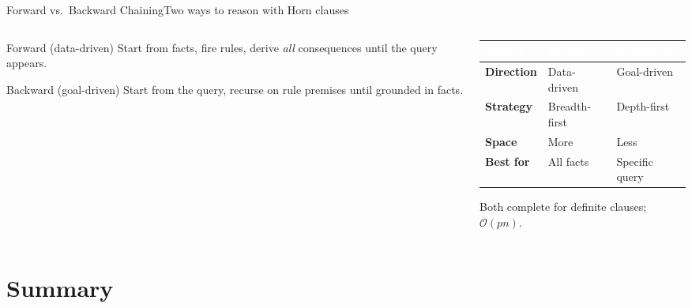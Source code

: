 \documentclass[aspectratio=169,11pt]{beamer}
\begin{document}
\begin{frame}{Forward vs.\ Backward Chaining}{Two ways to reason with Horn clauses}
  \begin{columns}[T]
    \begin{column}{0.5\textwidth}
      \begin{block}{Forward (data-driven)}
        \small Start from facts, fire rules, derive \emph{all} consequences until
        the query appears.
      \end{block}
      \begin{exampleblock}{Backward (goal-driven)}
        \small Start from the query, recurse on rule premises until grounded in facts.
      \end{exampleblock}
    \end{column}
    \begin{column}{0.5\textwidth}
      \small
      \renewcommand{\arraystretch}{1.3}
      \begin{tabularx}{\linewidth}{@{}>{\bfseries}l >{\raggedright\arraybackslash}X >{\raggedright\arraybackslash}X@{}}
        \toprule
        \rowcolor{PrimaryDark}
        \textcolor{white}{Aspect} & \textcolor{white}{Forward} & \textcolor{white}{Backward} \\
        \midrule
        Direction & Data-driven & Goal-driven \\
        \rowcolor{PrimaryLight!25}
        Strategy & Breadth-first & Depth-first \\
        Space & More & Less \\
        \rowcolor{PrimaryLight!25}
        Best for & All facts & Specific query \\
        \bottomrule
      \end{tabularx}
      \centering\scriptsize Both complete for definite clauses; $\mathcal{O}(pn)$.
    \end{column}
  \end{columns}
\end{frame}

\section{Summary}
\end{document}
